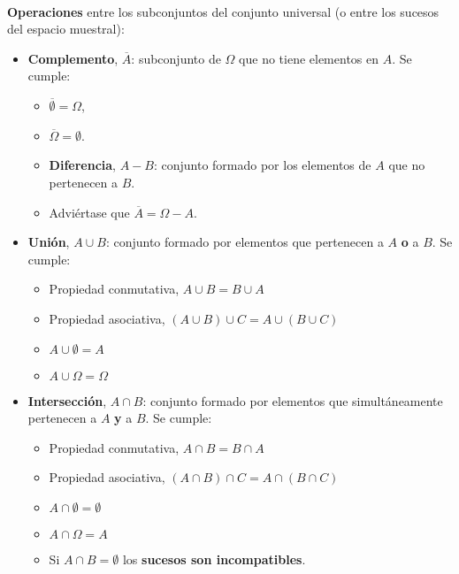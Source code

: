 \documentclass[11pt]{article}
\providecommand{\tightlist}{%
      \setlength{\itemsep}{0pt}\setlength{\parskip}{0pt}}
\begin{document}
    \begin{center}
    \end{center}
    { \hspace*{\fill} \\}
    
    \textbf{Operaciones} entre los subconjuntos del conjunto universal (o
entre los sucesos del espacio muestral): 
\begin{itemize}
\item \textbf{Complemento},
\(\overline A\): subconjunto de \(\Omega\) que no tiene elementos en
\(A\). Se cumple: 
\begin{itemize}
\item \(\overline \emptyset = \Omega\), 
\item
\(\overline \Omega = \emptyset\). 
\item \textbf{Diferencia}, \(A-B\):
conjunto formado por los elementos de \(A\) que no pertenecen a \(B\). 
\item
Adviértase que \(\overline A = \Omega - A\).
\end{itemize}

\tightlist
\item
  \textbf{Unión}, \(A \cup B\): conjunto formado por elementos que
  pertenecen a \(A\) \textbf{o} a \(B\). Se cumple:
 \begin{itemize}
\item
  Propiedad conmutativa, \(A \cup B = B \cup A\)
\item
  Propiedad asociativa, \((A \cup B) \cup C = A \cup (B\cup C)\)
\item
  \(A\cup\emptyset = A\)
\item
  \(A\cup\Omega=\Omega\)
\end{itemize}

\item
  \textbf{Intersección}, \(A \cap B\): conjunto formado por elementos
  que simultáneamente pertenecen a \(A\) \textbf{y} a \(B\). Se cumple:
\begin{itemize}
\item
  Propiedad conmutativa, \(A \cap B = B \cap A\)
\item
  Propiedad asociativa, \((A \cap B) \cap C = A \cap (B\cap C)\)
\item
  \(A\cap\emptyset = \emptyset\)
\item
  \(A\cap\Omega=A\)
\item
  Si \(A\cap B = \emptyset\) los \textbf{sucesos son incompatibles}.
\end{itemize}
\end{itemize}
    
\end{document}
